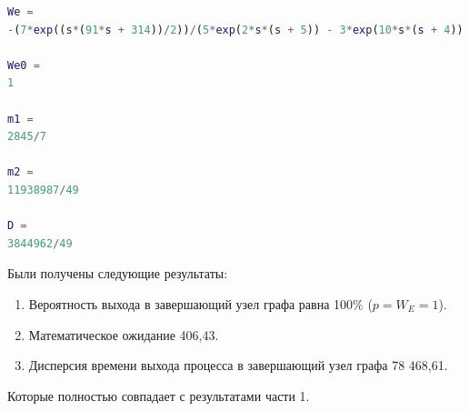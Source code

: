 \begin{lstlisting}[language={matlab}, caption={Результат}, basicstyle=\ttfamily]
We =
-(7*exp((s*(91*s + 314))/2))/(5*exp(2*s*(s + 5)) - 3*exp(10*s*(s + 4)) + 30*exp(2*s*(4*s + 15)) - exp((3*s*(15*s + 52))/2) + 10*exp((s*(41*s + 136))/2) + 2*exp((s*(91*s + 314))/2) - 50)
 
We0 =
1
 
m1 =
2845/7
 
m2 =
11938987/49
 
D =
3844962/49
\end{lstlisting}
Были получены следующие результаты:
\begin{enumerate}
\item Вероятность выхода в завершающий узел графа равна 100\% ($p=W_E=1$).
\item Математическое ожидание 406,43.
\item Дисперсия времени выхода процесса в завершающий узел графа 78 468,61.
\end{enumerate}
Которые полностью совпадает с результатами части 1.




%
%

